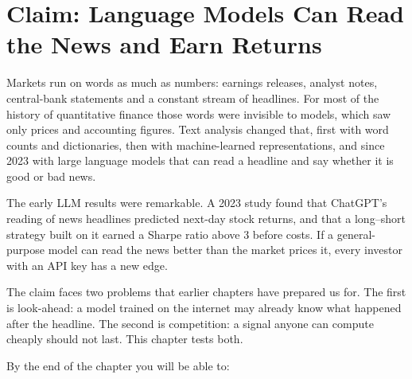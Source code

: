 \makeatletter
{}
\makeatother

\chapter{Claim: Language Models Can Read the News and Earn Returns}
\label{ch:23}

Markets run on words as much as numbers: earnings releases, analyst notes, central-bank statements and a constant stream of headlines. For most of the history of quantitative finance those words were invisible to models, which saw only prices and accounting figures. Text analysis changed that, first with word counts and dictionaries, then with machine-learned representations, and since 2023 with large language models that can read a headline and say whether it is good or bad news.

The early LLM results were remarkable. A 2023 study found that ChatGPT's reading of news headlines predicted next-day stock returns, and that a long--short strategy built on it earned a Sharpe ratio above 3 before costs. If a general-purpose model can read the news better than the market prices it, every investor with an API key has a new edge.

The claim faces two problems that earlier chapters have prepared us for. The first is look-ahead: a model trained on the internet may already know what happened after the headline. The second is competition: a signal anyone can compute cheaply should not last. This chapter tests both.

By the end of the chapter you will be able to:


